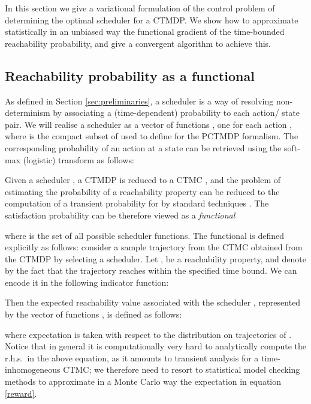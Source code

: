 In this section we give a variational formulation of the control problem of determining the optimal scheduler for a CTMDP. 
We show how to approximate statistically in an unbiased way the functional gradient of the time-bounded reachability probability, and give a convergent algorithm to achieve this. 





\subsection{Reachability probability as a functional}












As defined in Section \ref{sec:preliminaries}, a scheduler is a way of resolving non-determinism by associating a (time-dependent) probability to each action/ state pair. 
We will realise a scheduler as a vector  of  functions , one for each action , where  is the compact subset of  used to define  for the PCTMDP formalism. The corresponding probability of an action  at a state  can be retrieved using the soft-max (logistic) transform as follows:

Given a scheduler , a CTMDP is reduced  to a CTMC , and the problem of estimating the probability of a reachability property  can be reduced to the computation of a transient probability for  by standard techniques \cite{Baier2003}.
The satisfaction probability can be therefore viewed as a {\it functional} 

where  is the set of all possible scheduler functions.
The functional is defined explicitly as follows: consider a sample trajectory  from the CTMC  obtained from the CTMDP by selecting a scheduler. Let ,  be a reachability property, and denote by  the fact that the trajectory reaches  within the specified time bound. We can encode it in the following indicator function:

Then the expected reachability value associated with the scheduler , represented by the vector of functions , is defined as follows:

where expectation is taken with respect to the distribution on trajectories of .
Notice that in general it is computationally very hard to analytically compute the r.h.s.\ in the above equation, as it amounts to transient analysis for a time-inhomogeneous CTMC; we therefore need to resort to statistical model checking methods \cite{SB:Zuliani:2009:StatMC,MC:YounesSimmons:INFCOMP2006:statMC} to approximate in a Monte Carlo way the expectation in equation \eqref{reward}.

